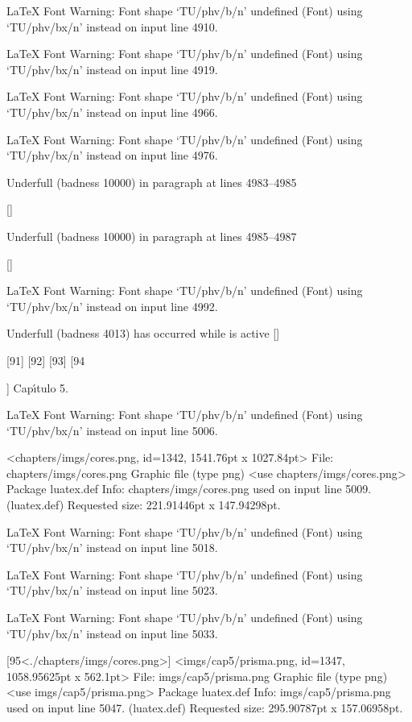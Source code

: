 LaTeX Font Warning: Font shape `TU/phv/b/n' undefined
(Font)              using `TU/phv/bx/n' instead on input line 4910.


LaTeX Font Warning: Font shape `TU/phv/b/n' undefined
(Font)              using `TU/phv/bx/n' instead on input line 4919.


LaTeX Font Warning: Font shape `TU/phv/b/n' undefined
(Font)              using `TU/phv/bx/n' instead on input line 4966.


LaTeX Font Warning: Font shape `TU/phv/b/n' undefined
(Font)              using `TU/phv/bx/n' instead on input line 4976.


Underfull \hbox (badness 10000) in paragraph at lines 4983--4985

 []


Underfull \hbox (badness 10000) in paragraph at lines 4985--4987

 []


LaTeX Font Warning: Font shape `TU/phv/b/n' undefined
(Font)              using `TU/phv/bx/n' instead on input line 4992.


Underfull \vbox (badness 4013) has occurred while \output is active []

[91] [92] [93] [94

]
Cap\'{\i }tulo 5.

LaTeX Font Warning: Font shape `TU/phv/b/n' undefined
(Font)              using `TU/phv/bx/n' instead on input line 5006.

<chapters/imgs/cores.png, id=1342, 1541.76pt x 1027.84pt>
File: chapters/imgs/cores.png Graphic file (type png)
<use chapters/imgs/cores.png>
Package luatex.def Info: chapters/imgs/cores.png  used on input line 5009.
(luatex.def)             Requested size: 221.91446pt x 147.94298pt.

LaTeX Font Warning: Font shape `TU/phv/b/n' undefined
(Font)              using `TU/phv/bx/n' instead on input line 5018.


LaTeX Font Warning: Font shape `TU/phv/b/n' undefined
(Font)              using `TU/phv/bx/n' instead on input line 5023.


LaTeX Font Warning: Font shape `TU/phv/b/n' undefined
(Font)              using `TU/phv/bx/n' instead on input line 5033.

[95<./chapters/imgs/cores.png>]
<imgs/cap5/prisma.png, id=1347, 1058.95625pt x 562.1pt>
File: imgs/cap5/prisma.png Graphic file (type png)
<use imgs/cap5/prisma.png>
Package luatex.def Info: imgs/cap5/prisma.png  used on input line 5047.
(luatex.def)             Requested size: 295.90787pt x 157.06958pt.

